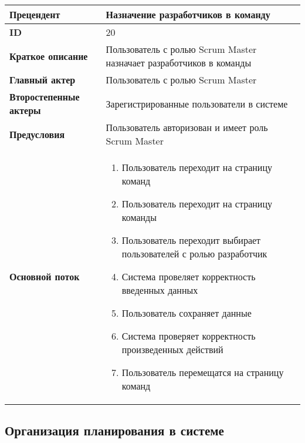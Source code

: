 \documentclass[14pt,a4paper]{extarticle}
\begin{document}
\begin{tabular}{|l|p{9cm}|}
	\hline
	\textbf{Прецендент}            & Назначение разработчиков в команду                                               \\
	\hline
	\textbf{ID}                    & 20                                                                               \\
	\hline
	\textbf{Краткое описание}      & Пользователь с ролью Scrum Master назначает разработчиков в команды              \\
	\hline
	\textbf{Главный актер}         & Пользователь с ролью Scrum Master                                                \\
	\hline
	\textbf{Второстепенные актеры} & Зарегистрированные пользователи в системе                                        \\
	\hline
	\textbf{Предусловия}           & Пользователь авторизован и имеет роль Scrum Master                               \\
	\hline
	\textbf{Основной поток}        & \begin{enumerate}
		                                 \item Пользователь переходит на страницу команд
		                                 \item Пользователь переходит на страницу команды
						 \item Пользователь переходит выбирает пользователей с ролью разработчик
						 \item Система провеляет корректность введенных данных
					         \item Пользователь сохраняет данные
		                                 \item Система проверяет корректность произведенных действий
						 \item Пользователь перемещатся на страницу команд
	                                 \end{enumerate} \\
	\hline
\end{tabular}

\subsection{Организация планирования в системе}
\end{document}
